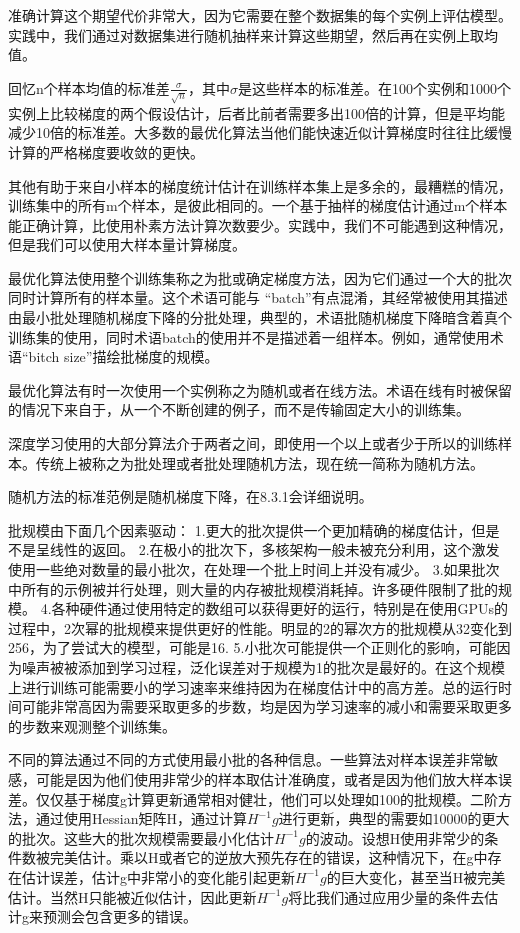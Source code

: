 准确计算这个期望代价非常大，因为它需要在整个数据集的每个实例上评估模型。实践中，我们通过对数据集进行随机抽样来计算这些期望，然后再在实例上取均值。
    
回忆n个样本均值的标准差$\frac{\sigma}{\sqrt{n}}$，其中$\sigma$是这些样本的标准差。在100个实例和1000个实例上比较梯度的两个假设估计，后者比前者需要多出100倍的计算，但是平均能减少10倍的标准差。大多数的最优化算法当他们能快速近似计算梯度时往往比缓慢计算的严格梯度要收敛的更快。

其他有助于来自小样本的梯度统计估计在训练样本集上是多余的，最糟糕的情况，训练集中的所有m个样本，是彼此相同的。一个基于抽样的梯度估计通过m个样本能正确计算，比使用朴素方法计算次数要少。实践中，我们不可能遇到这种情况，但是我们可以使用大样本量计算梯度。

最优化算法使用整个训练集称之为批或确定梯度方法，因为它们通过一个大的批次同时计算所有的样本量。这个术语可能与 “batch”有点混淆，其经常被使用其描述由最小批处理随机梯度下降的分批处理，典型的，术语批随机梯度下降暗含着真个训练集的使用，同时术语batch的使用并不是描述着一组样本。例如，通常使用术语“bitch size”描绘批梯度的规模。

最优化算法有时一次使用一个实例称之为随机或者在线方法。术语在线有时被保留的情况下来自于，从一个不断创建的例子，而不是传输固定大小的训练集。

深度学习使用的大部分算法介于两者之间，即使用一个以上或者少于所以的训练样本。传统上被称之为批处理或者批处理随机方法，现在统一简称为随机方法。

随机方法的标准范例是随机梯度下降，在8.3.1会详细说明。

批规模由下面几个因素驱动：
1.更大的批次提供一个更加精确的梯度估计，但是不是呈线性的返回。
2.在极小的批次下，多核架构一般未被充分利用，这个激发使用一些绝对数量的最小批次，在处理一个批上时间上并没有减少。
3.如果批次中所有的示例被并行处理，则大量的内存被批规模消耗掉。许多硬件限制了批的规模。
4.各种硬件通过使用特定的数组可以获得更好的运行，特别是在使用GPUs的过程中，2次幂的批规模来提供更好的性能。明显的2的幂次方的批规模从32变化到256，为了尝试大的模型，可能是16.
5.小批次可能提供一个正则化的影响，可能因为噪声被被添加到学习过程，泛化误差对于规模为1的批次是最好的。在这个规模上进行训练可能需要小的学习速率来维持因为在梯度估计中的高方差。总的运行时间可能非常高因为需要采取更多的步数，均是因为学习速率的减小和需要采取更多的步数来观测整个训练集。

不同的算法通过不同的方式使用最小批的各种信息。一些算法对样本误差非常敏感，可能是因为他们使用非常少的样本取估计准确度，或者是因为他们放大样本误差。仅仅基于梯度g计算更新通常相对健壮，他们可以处理如100的批规模。二阶方法，通过使用Hessian矩阵H，通过计算$H^{-1}g$进行更新，典型的需要如10000的更大的批次。这些大的批次规模需要最小化估计$H^{-1}g$的波动。设想H使用非常少的条件数被完美估计。乘以H或者它的逆放大预先存在的错误，这种情况下，在g中存在估计误差，估计g中非常小的变化能引起更新$H^{-1}g$的巨大变化，甚至当H被完美估计。当然H只能被近似估计，因此更新$H^{-1}g$将比我们通过应用少量的条件去估计g来预测会包含更多的错误。


